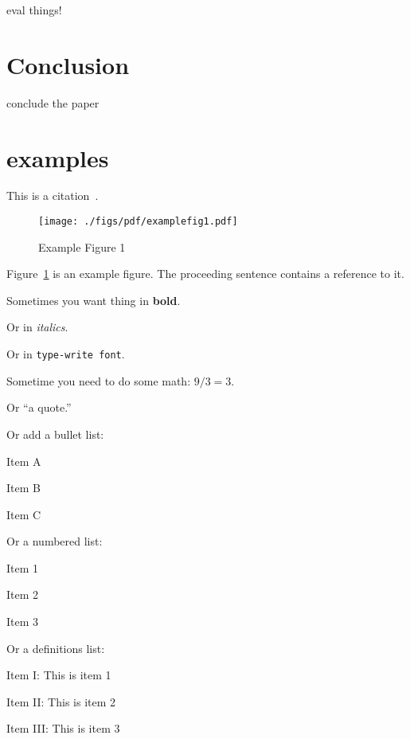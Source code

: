 \documentclass[11pt,twocolumn,letterpaper]{article}
\begin{document}
eval things!

\section{Conclusion}
\label{sec:conclusion}

conclude the paper

\section{examples}
\label{sec:ex}

\noindent
This is a citation~\cite{exampleref1}.



\begin{figure}[htb]
  \centering
  \texttt{[image: ./figs/pdf/examplefig1.pdf]}
  \caption{Example Figure 1}
  \label{fig:example1}
\end{figure}

\noindent
Figure~\ref{fig:example1} is an example figure. The proceeding
sentence contains a reference to it.

\noindent
Sometimes you want thing in {\bf bold}.

\noindent
Or in {\em italics}.

\noindent
Or in \texttt{type-write font}.

\noindent
Sometime you need to do some math: $9/3=3$.

\noindent
Or ``a quote.''

\noindent
Or add a bullet list:

\begin{packed_item}
\item Item A
\item Item B
\item Item C
\end{packed_item}

\noindent
Or a numbered list:

\begin{packed_enum}
\item Item 1
\item Item 2
\item Item 3
\end{packed_enum}

\noindent
Or a definitions list:

\begin{packed_desc}
\item[Item I:] This is item 1 
\item[Item II:] This is item 2
\item[Item III:] This is item 3
\end{packed_desc}




\end{document}
